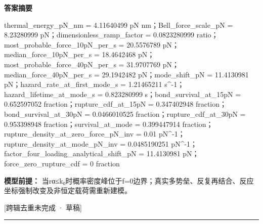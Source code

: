 \documentclass[UTF8,11pt,a4paper]{ctexart}
\begin{document}
\noindent\textbf{答案摘要}\par
thermal\_energy\_pN\_nm = 4.11640499 pN nm；Bell\_force\_scale\_pN = 8.23280999 pN；dimensionless\_ramp\_factor = 0.0823280999 ratio；most\_probable\_force\_10pN\_per\_s = 20.5576789 pN；median\_force\_10pN\_per\_s = 18.4642468 pN；most\_probable\_force\_40pN\_per\_s = 31.9707769 pN；median\_force\_40pN\_per\_s = 29.1942482 pN；mode\_shift\_pN = 11.4130981 pN；hazard\_rate\_at\_first\_mode\_s = 1.21465211 s\textasciicircum{}-1；hazard\_lifetime\_at\_mode\_s = 0.823280999 s；bond\_survival\_at\_15pN = 0.652597052 fraction；rupture\_cdf\_at\_15pN = 0.347402948 fraction；bond\_survival\_at\_30pN = 0.0466010525 fraction；rupture\_cdf\_at\_30pN = 0.953398948 fraction；survival\_at\_mode = 0.399447914 fraction；rupture\_density\_at\_zero\_force\_pN\_inv = 0.01 pN\textasciicircum{}-1；rupture\_density\_at\_mode\_pN\_inv = 0.0485190251 pN\textasciicircum{}-1；factor\_four\_loading\_analytical\_shift\_pN = 11.4130981 pN；force\_zero\_rupture\_cdf = 0 fraction\par
\noindent\textbf{模型前提：}
当rα≤k₀时概率密度峰位于f=0边界；真实多势垒、反复再结合、反应坐标强制改变及非恒定载荷需重新建模。\par
\noindent\textcolor{red!65!black}{[跨辑去重未完成 · 草稿]} \par
\medskip\hrule\medskip
{}
\end{document}
